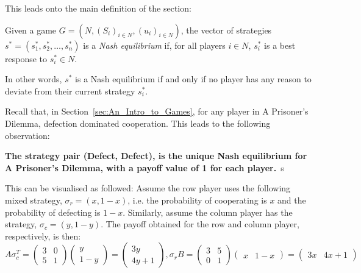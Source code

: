 This leads onto the main definition of the section:
\begin{definition}\label{def:NE}
    Given a game \(G=(N, (S_{i})_{i \in N}, (u_{i})_{i \in N})\), the vector of
    strategies \(s^{*} = (s_{1}^{*}, s_{2}^{*}, \ldots, s_{n}^{*})\) is a
    \textit{Nash equilibrium} if, for all players \(i \in N\), \(s_{i}^{*}\) is a best response to \(s_{i}^{*} \in N\).~\cite{maschler_solan_zamir_2013}
\end{definition}
In other words, \(s^{*}\) is a Nash equilibrium if and only if no player has any
reason to deviate from their current strategy \(s_{i}^{*}\).

Recall that, in Section~\ref{sec:An_Intro_to_Games}, for any player in A
Prisoner's Dilemma, defection dominated cooperation. This leads to the following
observation:
\begin{center}
    \textbf{The strategy pair (Defect, Defect), is the unique Nash equilibrium for A Prisoner's Dilemma, with a payoff value of 1 for each player.}~s\cite{maschler_solan_zamir_2013}
\end{center}
This can be visualised as followed:
Assume the row player uses the following mixed strategy, \(\sigma_{r} = (x,
1-x)\), i.e. the probability of cooperating is \(x\) and the probability of
defecting is \(1-x\). Similarly, assume the column player has 
the strategy, \(\sigma_{c} = (y, 1-y)\). The payoff obtained for the row and column player, respectively, is then:
\[
    A\sigma_{c}^T = \begin{pmatrix}
        3 & 0 \\
        5 & 1
    \end{pmatrix} \begin{pmatrix}
        y \\
        1-y
    \end{pmatrix} = \begin{pmatrix}
        3y \\
        4y + 1
    \end{pmatrix},

    \sigma_{r}B = \begin{pmatrix}
        3 & 5 \\
        0 & 1        
    \end{pmatrix} \begin{pmatrix}
        x & 1-x
    \end{pmatrix} = \begin{pmatrix}
        3x & 4x + 1
    \end{pmatrix}
\]

